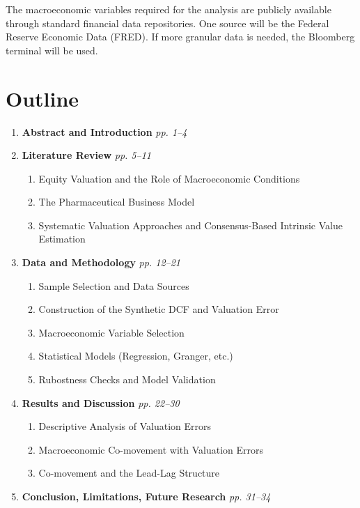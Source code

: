 \documentclass[11pt, a4paper]{article}
\begin{document}
The macroeconomic variables required for the analysis are publicly available through standard financial data repositories. One source will be the Federal Reserve Economic Data (FRED). If more granular data is needed, the Bloomberg terminal will be used.
\pagebreak
\section{Outline}

\begin{enumerate}[label=\textbf{\arabic*.}]
    \item \textbf{Abstract and Introduction} \hfill \textit{pp. 1--4}
    \item \textbf{Literature Review} \hfill \textit{pp. 5--11}
    \begin{enumerate}[label=\arabic{enumi}.\arabic*]
        \item Equity Valuation and the Role of Macroeconomic Conditions
        \item The Pharmaceutical Business Model
        \item Systematic Valuation Approaches and Consensus-Based Intrinsic Value Estimation
    \end{enumerate}
    \item \textbf{Data and Methodology} \hfill \textit{pp. 12--21}
    \begin{enumerate}[label=\arabic{enumi}.\arabic*]
        \item Sample Selection and Data Sources
        \item Construction of the Synthetic DCF and Valuation Error
        \item Macroeconomic Variable Selection
        \item Statistical Models (Regression, Granger, etc.)
        \item Rubostness Checks and Model Validation
    \end{enumerate}
    \item \textbf{Results and Discussion} \hfill \textit{pp. 22--30}
    \begin{enumerate}[label=\arabic{enumi}.\arabic*]
        \item Descriptive Analysis of Valuation Errors
        \item Macroeconomic Co-movement with Valuation Errors
        \item Co-movement and the Lead-Lag Structure
    \end{enumerate} 
    \item \textbf{Conclusion, Limitations, Future Research} \hfill \textit{pp. 31--34}
\end{enumerate}
\end{document}

